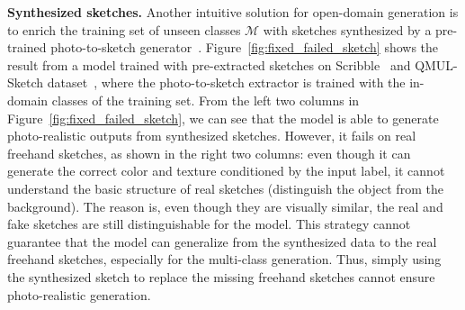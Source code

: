 \documentclass[10pt,twocolumn,letterpaper]{article}
\begin{document}
\noindent \textbf{Synthesized sketches.} Another intuitive solution for open-domain generation is to enrich the training set of unseen classes $\mathcal{M}$ with sketches synthesized by a pre-trained photo-to-sketch generator~\cite{liu2019unpaired}. Figure~\ref{fig:fixed_failed_sketch} shows the result from a model trained with pre-extracted sketches on Scribble~\cite{ghosh2019interactive} and QMUL-Sketch dataset~\cite{yu2016sketch,song2017deep,liu2019unpaired}, where the photo-to-sketch extractor is trained with the in-domain classes of the training set. From the left two columns in Figure~\ref{fig:fixed_failed_sketch}, we can see that the model is able to generate photo-realistic outputs from synthesized sketches. However, it fails on real freehand sketches, as shown in the right two columns: even though it can generate the correct color and texture conditioned by the input label, it cannot understand the basic structure of real sketches (\eg distinguish the object from the background). The reason is, even though they are visually similar, the real and fake sketches are still distinguishable for the model. This strategy cannot guarantee that the model can generalize from the synthesized data to the real freehand sketches, especially for the multi-class generation. Thus, simply using the synthesized sketch to replace the missing freehand sketches cannot ensure photo-realistic generation. 
\end{document}
